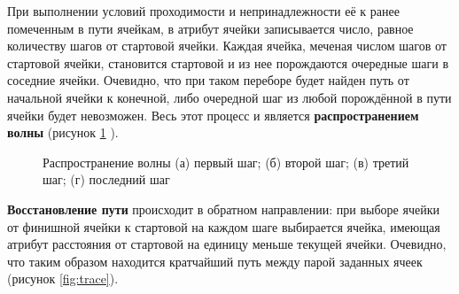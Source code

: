 При выполнении условий проходимости и непринадлежности её к ранее помеченным в пути ячейкам, в атрибут ячейки записывается число, равное количеству шагов от стартовой ячейки. Каждая ячейка, меченая числом шагов от стартовой ячейки, становится стартовой и из нее порождаются очередные шаги в соседние ячейки. Очевидно, что при таком переборе будет найден путь от начальной ячейки к конечной, либо очередной шаг из любой порождённой в пути ячейки будет невозможен. Весь этот процесс и является \textbf{распространением волны} (рисунок \ref{fig:steps} \cite{byte:li}).

\begin{figure}[ht]
    \qquad
    \qquad
    \qquad
    \caption{Распространение волны (а) первый шаг; (б) второй шаг; (в) третий шаг; (г) последний шаг}
    \label{fig:steps}
\end{figure}

\textbf{Восстановление пути} происходит в обратном направлении: при выборе ячейки от финишной ячейки к стартовой на каждом шаге выбирается ячейка, имеющая атрибут расстояния от стартовой на единицу меньше текущей ячейки. Очевидно, что таким образом находится кратчайший путь между парой заданных ячеек \cite{wiki:li,byte:li} (рисунок \ref{fig:trace}).

